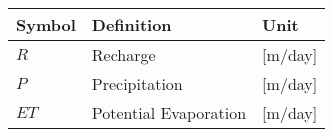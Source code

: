 \begin{longtable}{p{2.5cm}p{8cm}p{2.5cm}}
    \toprule
    Symbol & Definition & Unit \\
    \midrule\endhead %
    $R$ & Recharge & [m/day] \\
    $P$ & Precipitation & [m/day] \\
    $ET$ & Potential Evaporation & [m/day]\\
    \midrule %
    \bottomrule
\end{longtable}


